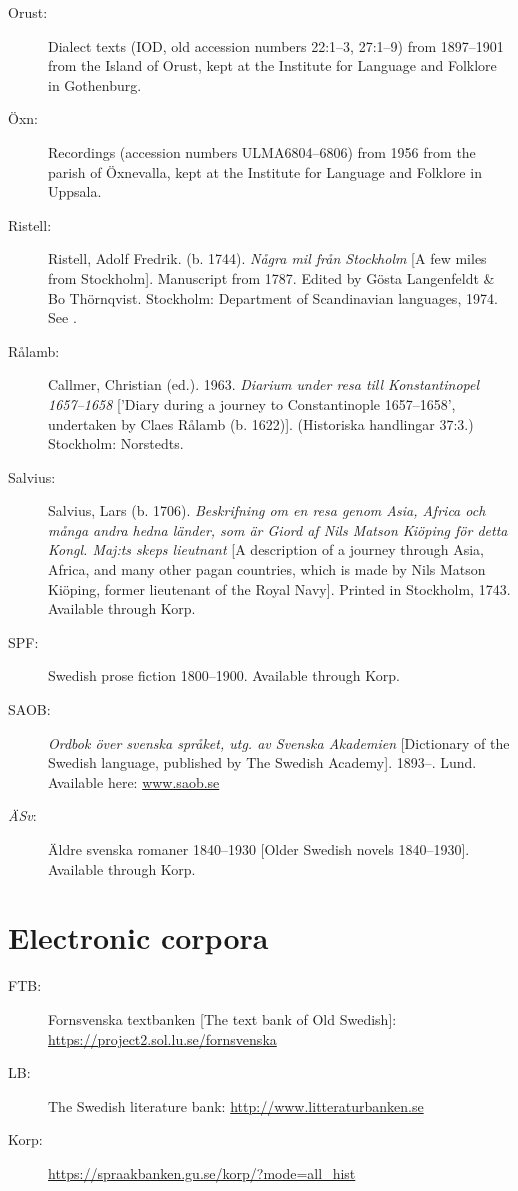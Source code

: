 \documentclass[output=paper]{langscibook}
\begin{document}
\begin{description}
\item[Orust:] Dialect texts (IOD, old accession numbers 22:1–3, 27:1–9) from 1897–1901 from the Island of Orust, kept at the Institute for Language and Folklore in Gothenburg.
\item[Öxn:] Recordings (accession numbers ULMA6804–6806) from 1956 from the parish of Öxnevalla, kept at the Institute for Language and Folklore in Uppsala.
\item[Ristell:] Ristell, Adolf Fredrik. (b. 1744). \textit{Några mil från Stockholm} [A few miles from Stockholm]. Manuscript from 1787. Edited by Gösta Langenfeldt \& Bo Thörnqvist. Stockholm: Department of Scandinavian languages, 1974. See \citet{MarttalaStromquist2001}.
\item[Rålamb:] Callmer, Christian (ed.). 1963. \textit{Diarium under resa till Konstantinopel 1657–1658} [’Diary during a journey to Constantinople 1657–1658’, undertaken by Claes Rålamb (b. 1622)]. (Historiska handlingar 37:3.) Stockholm: Norstedts.
\item[Salvius:] Salvius, Lars (b. 1706). \textit{Beskrifning om en resa genom Asia, Africa och många andra hedna länder, som är Giord af Nils Matson Kiöping för detta Kongl. Maj:ts skeps lieutnant} [A description of a journey through Asia, Africa, and many other pagan countries, which is made by Nils Matson Kiöping, former lieutenant of the Royal Navy]. Printed in Stockholm, 1743. Available through Korp.
\item[SPF:] Swedish prose fiction 1800–1900. Available through Korp.
\item[SAOB:] \textit{Ordbok över svenska språket, utg. av Svenska Akademien} [Dictionary of the Swedish language, published by The Swedish Academy]. 1893–. Lund. Available here: \href{http://www.saob.se}{{www.saob.se}}
\item[\textit{ÄSv}:] Äldre svenska romaner 1840–1930 [Older Swedish novels 1840–1930]. Available through Korp.
\end{description}

\section*{Electronic corpora}

\begin{description}
\item[FTB:] Fornsvenska textbanken [The text bank of Old Swedish]: \url{https://project2.sol.lu.se/fornsvenska} 
\item[LB:] The Swedish literature bank: \url{http://www.litteraturbanken.se}
\item[Korp:] \url{https://spraakbanken.gu.se/korp/?mode=all_hist}
\end{description}

\sloppy\printbibliography[heading=subbibliography,notkeyword=this]
\end{document}
